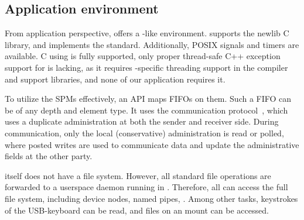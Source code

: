 
\subsection{Application environment}

From application perspective, \Helix offers a -like environment.
\Helix supports the newlib C library, and implements the  standard.
Additionally, \ac{POSIX} signals and timers are available.
C using  is fully supported, only proper thread-safe C++ exception support for  is lacking, as it requires \MicroBlaze-specific threading support in the compiler and support libraries, and none of our application requires it.

To utilize the \acp{SPM} effectively, an \ac{API} maps \acp{FIFO} on them.
Such a \ac{FIFO} can be of any depth and element type.
It uses the  communication protocol~\cite{nieuwland:c-heap}, which uses a duplicate administration at both the sender and receiver side.
During communication, only the local (conservative) administration is read or polled, where posted writes are used to communicate data and update the administrative fields at the other party.

\Helix itself does not have a file system.
However, all standard file operations are forwarded to a userspace daemon running in .
Therefore, all \MicroBlazes can access the full file system, including device nodes, named pipes, \etc.
Among other tasks, keystrokes of the \ac{USB}-keyboard can be read, and files on an  mount can be accessed.



